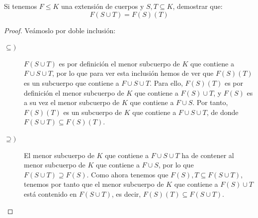 \begin{ejercicio}
    Si tenemos $F\leq K$ una extensión de cuerpos y $S,T\subseteq K$, demostrar que:
    \begin{equation*}
        F(S\cup T) = F(S)(T)
    \end{equation*}
    \begin{proof}
        Veámoslo por doble inclusión:
        \begin{description}
            \item [$\subseteq )$] $F(S\cup T)$ es por definición el menor subcuerpo de $K$ que contiene a $F\cup S\cup T$, por lo que para ver esta inclusión hemos de ver que $F(S)(T)$ es un subcuerpo que contiene a $F\cup S\cup T$. Para ello, $F(S)(T)$ es por definición el menor subcuerpo de $K$ que contiene a $F(S)\cup T$, y $F(S)$ es a su vez el menor subcuerpo de $K$ que contiene a $F\cup S$. Por tanto, $F(S)(T)$ es un subcuerpo de $K$ que contiene a $F\cup S\cup T$, de donde $F(S\cup T)\subseteq F(S)(T)$.
            \item [$\supseteq )$] El menor subcuerpo de $K$ que contiene a $F\cup S\cup T$ ha de contener al menor subcuerpo de $K$ que contiene a $F\cup S$, por lo que $F(S\cup T)\supseteq F(S)$. Como ahora tenemos que $F(S),T\subseteq F(S\cup T)$, tenemos por tanto que el menor subcuerpo de $K$ que contiene a $F(S)\cup T$ está contenido en $F(S\cup T)$, es decir, $F(S)(T)\subseteq F(S\cup T)$.
        \end{description}
    \end{proof}
\end{ejercicio}

